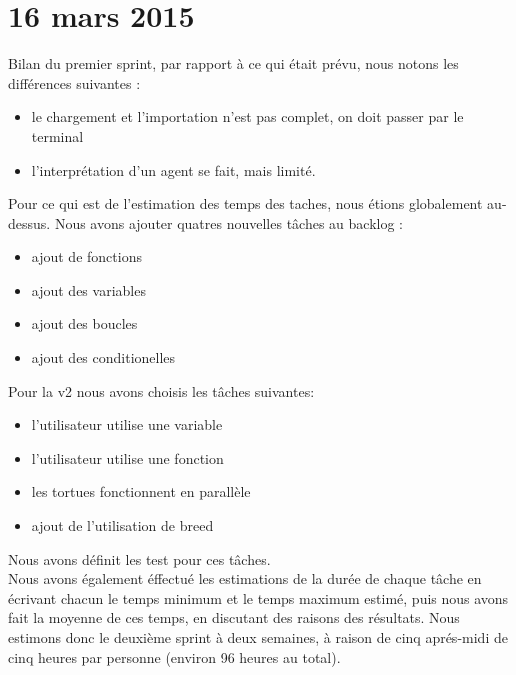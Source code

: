 \section{16 mars 2015}

Bilan du premier sprint, par rapport à ce qui était prévu, nous notons les différences suivantes :
\begin{itemize}
\item le chargement et l'importation n'est pas complet, on doit passer par le terminal
\item l'interprétation d'un agent se fait, mais limité.
\end{itemize}
Pour ce qui est de l'estimation des temps des taches, nous étions globalement au-dessus.
Nous avons ajouter quatres nouvelles tâches au backlog :
\begin{itemize}
\item ajout de fonctions
\item ajout des variables
\item ajout des boucles
\item ajout des conditionelles
\end{itemize}
Pour la v2 nous avons choisis les tâches suivantes:
\begin{itemize}
\item l'utilisateur utilise une variable
\item l'utilisateur utilise une fonction
\item les tortues fonctionnent en parallèle
\item ajout de l'utilisation de breed
\end{itemize}
Nous avons définit les test pour ces tâches.\\
Nous avons également éffectué les estimations de la durée de chaque tâche en écrivant chacun le temps minimum et le temps maximum estimé, puis nous avons fait la moyenne de ces temps, en discutant des raisons des résultats.
Nous estimons donc le deuxième sprint à deux semaines, à raison de cinq aprés-midi de cinq heures par personne (environ 96 heures au total).\\

